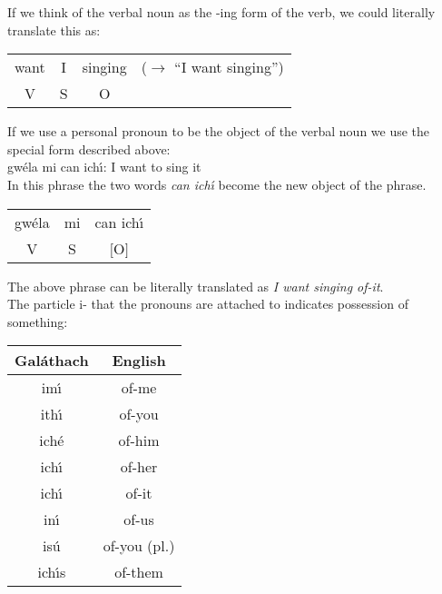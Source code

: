 \noindent If we think of the verbal noun as the -ing form of the verb, we could literally translate this as:
\begin{table}[H]
\begin{tabu}{cccc}
  want & I & singing & ($\rightarrow$ ``I want singing'')\\
  V & S & O &
\end{tabu}
\label{verbal_noun_ing_form}
\end{table}

\noindent If we use a personal pronoun to be the object of the verbal noun we use the special form described above:\\
\noindent gw\'{e}la mi can ich\'{\i}: I want to sing it\\

\noindent In this phrase the two words \textit{can ich\'{\i}} become the new object of the phrase.
\begin{table}[H]
\begin{tabu}{ccc}
    gw\'{e}la & mi & can ich\'{\i}\\
    V & S & $[$\hspace{0.5cm}O\hspace{0.5cm}$]$
\end{tabu}
\label{personal_pronoun_as_object_of_verbal_noun}
\end{table}

\noindent The above phrase can be literally translated as \textit{I want singing of-it}.\\

\noindent The particle i- that the pronouns are attached to indicates possession of something:
\begin{table}[H]
\centering
\begin{tabu}{c|c}
  \textbf{Gal\'{a}thach} & \textbf{English}\\
  \toprule
  im\'{\i} & of-me\\
  ith\'{\i} & of-you\\
  ich\'{e} & of-him\\
  ich\'{\i} & of-her\\
  ich\'{\i} & of-it\\
  in\'{\i} & of-us\\
  is\'{u} & of-you (pl.)\\
  ich\'{\i}s & of-them
\end{tabu}
\label{personal_pronoun_particle_i}
\end{table}

